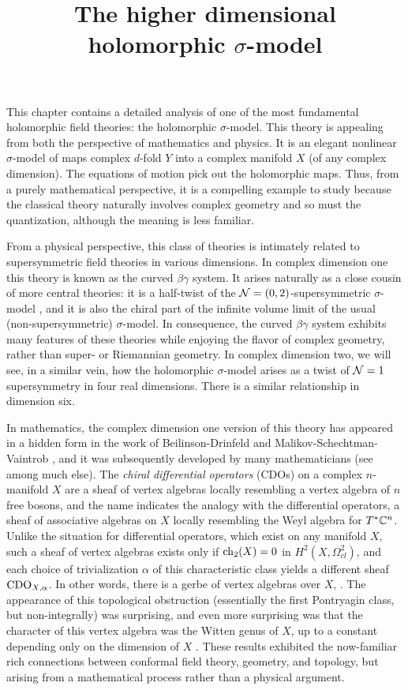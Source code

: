 \documentclass[10pt]{amsart}
\title{The higher dimensional holomorphic $\sigma$-model}
\begin{document}
\maketitle
\tableofcontents

This chapter contains a detailed analysis of one of the most fundamental holomorphic field theories: the holomorphic $\sigma$-model.
This theory is appealing from both the perspective of mathematics and physics.
It is an elegant nonlinear $\sigma$-model of maps complex $d$-fold $Y$ into a complex manifold $X$ (of any complex dimension). The equations of motion pick out the holomorphic maps. 
Thus, from a purely mathematical perspective, it is a compelling example to study 
because the classical theory naturally involves complex geometry and so must the quantization, although the meaning is less familiar. 

From a physical perspective, this class of theories is intimately related to supersymmetric field theories in various dimensions.
In complex dimension one this theory is known as the curved $\beta\gamma$ system.
It arises naturally as a close cousin of more central theories: it is a half-twist of the $\mathcal N = (0,2)$-supersymmetric $\sigma$-model \cite{WittenCDO}, and it is also the chiral part of the infinite volume limit of the usual (non-supersymmetric) $\sigma$-model. 
In consequence, the curved $\beta\gamma$ system exhibits many features of these theories while enjoying the flavor of complex geometry, rather than super- or Riemannian geometry.
In complex dimension two, we will see, in a similar vein, how the holomorphic $\sigma$-model arises as a twist of $\mathcal N = 1$ supersymmetry in four real dimensions. 
There is a similar relationship in dimension six.

In mathematics, the complex dimension one version of this theory has appeared in a hidden form in the work of Beilinson-Drinfeld and Malikov-Schechtman-Vaintrob \cite{BD,MSV}, and it was subsequently developed by many mathematicians (see \cite{KV,Cheung,Bressler} among much else). The {\em chiral differential operators} (CDOs) on a complex $n$-manifold $X$ are a sheaf of vertex algebras locally resembling a vertex algebra of $n$ free bosons, and the name indicates the analogy with the differential operators, a sheaf of associative algebras on $X$ locally resembling the Weyl algebra for $T^*\mathbb C^n$. Unlike the situation for differential operators, which exist on any manifold $X$, such a sheaf of vertex algebras exists only if ${\rm ch}_2(X) = 0$ in $H^2(X, \Omega^2_{cl})$, and each choice of trivialization $\alpha$ of this characteristic class yields a different sheaf ${\rm CDO}_{X,\alpha}$. In other words, there is a gerbe of vertex algebras over $X$, \cite{GMS}. The appearance of this topological obstruction (essentially the first Pontryagin class, but non-integrally) was surprising, and even more surprising was that the character of this vertex algebra was the Witten genus of $X$, up to a constant depending only on the dimension of $X$ \cite{BorLib}. These results exhibited the now-familiar rich connections between conformal field theory, geometry, and topology, but arising from a mathematical process rather than a physical argument. 
\end{document}
